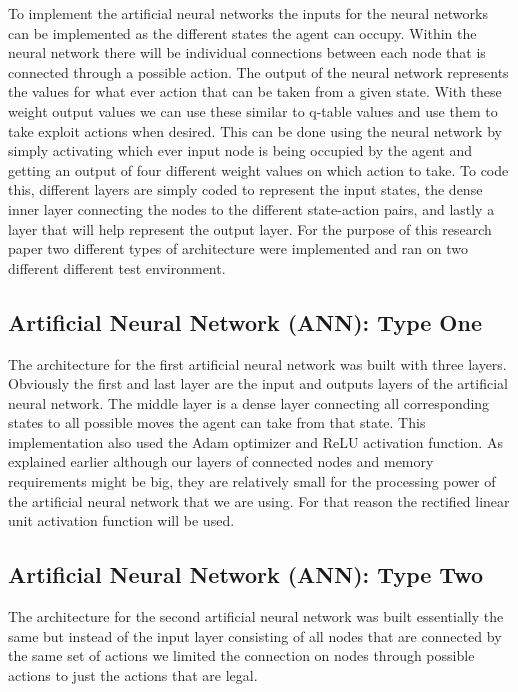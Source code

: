 \documentclass[letterpaper]{article}
\begin{document}
\indent  To implement the artificial neural networks the inputs for the neural  networks can be implemented as the different states the agent can occupy. Within the neural network there will be individual connections between each node that is connected through a possible action. The output of the neural network represents the values for what ever action that can be taken from a given state. With these weight output values we can use these similar to q-table values and use them to take exploit actions when desired.  This can be done using the neural network by simply activating which ever input node is being occupied by the agent and getting an output of four different weight values on which action to take. To code this, different layers are simply coded to represent the input states, the dense inner layer connecting the nodes to the different state-action pairs, and lastly a layer that will help represent the output layer. For the purpose of this research paper two different types of architecture were implemented and ran on two different different test environment.\\

\subsection{Artificial Neural Network (ANN): Type One}
\indent The architecture for the first artificial neural network was built with three layers.  Obviously the first and last layer are the input and outputs layers of the artificial neural network. The middle layer is a dense layer connecting all corresponding states to all possible moves the agent can take from that state.  This implementation also used the Adam optimizer and ReLU activation function.  As explained earlier although our layers of connected nodes and memory requirements might be big, they are relatively small for the processing power of the artificial neural network that we are using.  For that reason the rectified linear unit activation function will be used.   

\subsection{Artificial Neural Network (ANN): Type Two}
\indent The architecture for the second artificial neural network was built essentially the same but instead of the input layer consisting of all nodes that are connected by the same set of actions we limited the connection on nodes through possible actions to just the actions that are legal.
\end{document}
